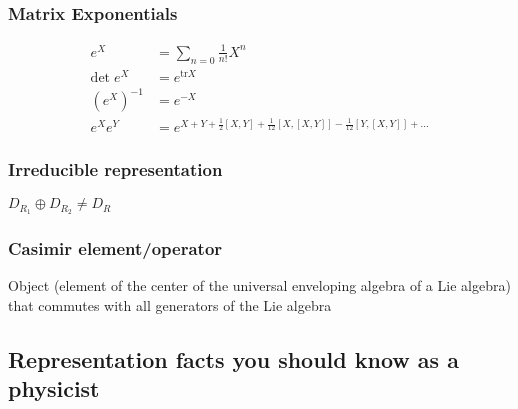 \documentclass[../main.tex]{subfiles}
\begin{document}
\subsubsection{Matrix Exponentials}
\begin{align}
e^X&=\sum_{n=0}\frac{1}{n!}X^n\\
\text{det}\;e^X&=e^{\text{tr} X} \\
\left(e^X\right)^{-1}&=e^{-X}\\
e^Xe^Y&=e^{X+Y+\frac{1}{2}[X,Y]+\frac{1}{12}[X,[X,Y]]-\frac{1}{12}[Y,[X,Y]]+...}
\end{align}


\subsubsection{Irreducible representation}
$ D_{R_1} \oplus D_{R_2} \neq D_R$

\subsubsection{Casimir element/operator}
Object (element of the center of the universal enveloping algebra of a Lie algebra) that commutes with all generators of the Lie algebra

\subsection{Representation facts you should know as a physicist}
\end{document}
